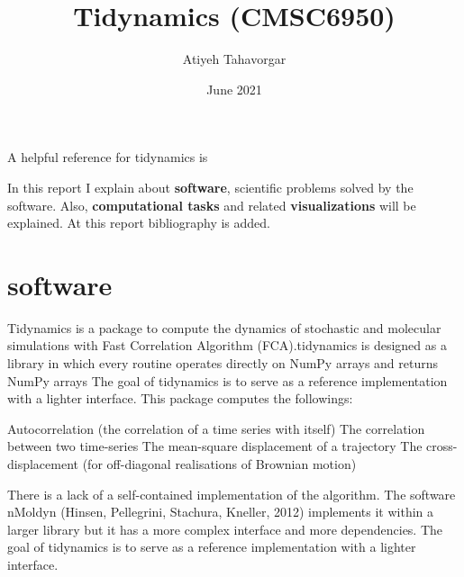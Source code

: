 \documentclass[12pt, a4paper, twoside]{report}
\title{Tidynamics (CMSC6950)}
\author{Atiyeh Tahavorgar }
\date{June 2021}
\begin{document}
\maketitle

A helpful reference for tidynamics is \cite{tidynamics_2018}

\newpage






In this report I explain about \textbf{software}, scientific problems solved by the software. Also, \textbf{computational tasks} and related \textbf{visualizations} will be explained. At this report bibliography is added. 
\newpage
\section{software}
Tidynamics is a package to compute the dynamics of stochastic and molecular simulations with Fast Correlation Algorithm (FCA).tidynamics is designed as a library in which every routine operates directly on NumPy
arrays and returns NumPy arrays The goal of tidynamics is to serve as a reference implementation with a lighter interface. This package computes the followings:


Autocorrelation (the correlation of a time series with itself) 
The correlation between two time-series
\newline The mean-square displacement of a trajectory   
\newline  The cross-displacement (for off-diagonal realisations of Brownian motion)


There is a lack of a self-contained implementation of the algorithm. The software nMoldyn (Hinsen, Pellegrini, Stachura,  Kneller, 2012) implements it within a larger library but it has a more complex interface and more dependencies. The goal of tidynamics is to serve as a reference implementation with a lighter interface. 
\end{document}
